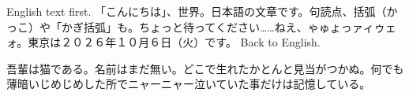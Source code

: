 \documentclass{article}
\begin{document}
English text first.
\textjapanese{「こんにちは」、世界。日本語の文章です。句読点、括弧（かっこ）や「かぎ括弧」も。ちょっと待ってください……ねえ、ゃゅょっァィゥェォ。東京は２０２６年１０月６日（火）です。}
Back to English.

\begin{japanese}
吾輩は猫である。名前はまだ無い。どこで生れたかとんと見当がつかぬ。何でも薄暗いじめじめした所でニャーニャー泣いていた事だけは記憶している。
\end{japanese}

\end{document}
